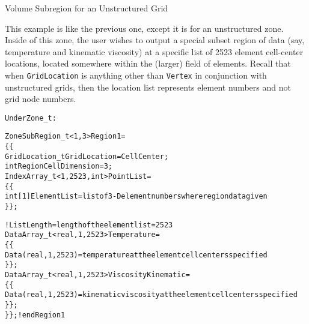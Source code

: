 \begin{example}{Volume Subregion for an Unstructured Grid}
\label{ex:zonesubregion2}

This example is like the previous one, except it is for an unstructured zone.
Inside of this zone, the user wishes to output a special subset region of
data (say, temperature and kinematic viscosity) at a specific list of 2523
element cell-center locations, located somewhere within the (larger) field
of elements. Recall that when \texttt{GridLocation} is anything other than
\texttt{Vertex} in conjunction with unstructured grids, then the location list
represents element numbers and not grid node numbers.

\begin{alltt}
Under Zone\_t:

  ZoneSubRegion\_t<1,3> Region1 =
    \{\{
    GridLocation\_t GridLocation = CellCenter ;
    int RegionCellDimension = 3;
    IndexArray\_t<1,2523,int> PointList =
      \{\{
      int[1] ElementList = list of 3-D element numbers where region data given
      \}\} ;

    ! ListLength = length of the element list = 2523
    DataArray\_t<real,1,2523> Temperature =
      \{\{
      Data(real,1,2523) = temperature at the element cell centers specified
      \}\} ;
    DataArray\_t<real,1,2523> ViscosityKinematic =
      \{\{
      Data(real,1,2523) = kinematic viscosity at the element cell centers specified
      \}\} ;
    \}\} ; ! end Region1
\end{alltt}

\end{example}

